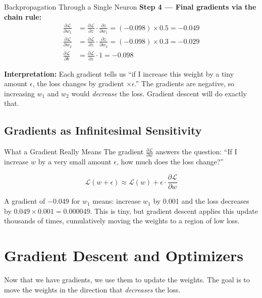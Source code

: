 \begin{examplebox}{Backpropagation Through a Single Neuron}
\textbf{Step 4 --- Final gradients via the chain rule:}
\begin{align*}
    \frac{\partial \mathcal{L}}{\partial w_1} &= \frac{\partial \mathcal{L}}{\partial z} \cdot \frac{\partial z}{\partial w_1} = (-0.098) \times 0.5 = -0.049 \\
    \frac{\partial \mathcal{L}}{\partial w_2} &= \frac{\partial \mathcal{L}}{\partial z} \cdot \frac{\partial z}{\partial w_2} = (-0.098) \times 0.3 = -0.029 \\
    \frac{\partial \mathcal{L}}{\partial b}   &= \frac{\partial \mathcal{L}}{\partial z} \cdot 1 = -0.098
\end{align*}

\textbf{Interpretation:} Each gradient tells us ``if I increase this weight by a tiny amount $\epsilon$, the loss changes by gradient $\times \epsilon$.'' The gradients are negative, so increasing $w_1$ and $w_2$ would \emph{decrease} the loss. Gradient descent will do exactly that.
\end{examplebox}

\subsection{Gradients as Infinitesimal Sensitivity}

\begin{keyinsight}{What a Gradient Really Means}
The gradient $\frac{\partial \mathcal{L}}{\partial w}$ answers the question: ``If I increase $w$ by a very small amount $\epsilon$, how much does the loss change?''

\[
    \mathcal{L}(w + \epsilon) \approx \mathcal{L}(w) + \epsilon \cdot \frac{\partial \mathcal{L}}{\partial w}
\]

A gradient of $-0.049$ for $w_1$ means: increase $w_1$ by $0.001$ and the loss decreases by $0.049 \times 0.001 = 0.000049$. This is tiny, but gradient descent applies this update thousands of times, cumulatively moving the weights to a region of low loss.
\end{keyinsight}

\section{Gradient Descent and Optimizers}
\label{sec:optimizers}

Now that we have gradients, we use them to update the weights. The goal is to move the weights in the direction that \emph{decreases} the loss.

